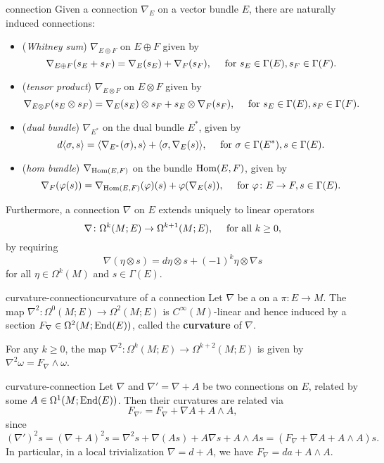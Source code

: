 \begin{example}{connection}
    Given a connection $\nabla_E$ on a vector bundle $E$, there are naturally induced connections:
    \begin{itemize}
        \item (\textit{Whitney sum}) $\nabla_{E \oplus F}$ on $E \oplus F$ given by
        \[ \nabla_{E \oplus F}(s_E + s_F) = \nabla_E(s_E) + \nabla_F(s_F), \quad \textup{ for } s_E \in \Gamma(E), s_F \in \Gamma(F) . \]
        \item (\textit{tensor product}) $\nabla_{E \otimes F}$ on $E \otimes F$ given by
        \[ \nabla_{E \otimes F}(s_E \otimes s_F) = \nabla_E(s_E) \otimes s_F + s_E \otimes \nabla_F(s_F), \quad \textup{ for } s_E \in \Gamma(E), s_F \in \Gamma(F) . \]
        \item (\textit{dual bundle}) $\nabla_{E^*}$ on the dual bundle $E^*$, given by
        \[ d \langle \sigma, s \rangle = \langle \nabla_{E^*} (\sigma), s \rangle + \langle \sigma, \nabla_E(s) \rangle, \quad \textup{ for } \sigma \in \Gamma(E^*), s \in \Gamma(E) . \]
        \item (\textit{hom bundle}) $\nabla_{\operatorname{Hom}(E, F)}$ on the bundle $\operatorname{Hom}(E, F)$, given by
        \[ \nabla_F(\varphi(s)) = \nabla_{\operatorname{Hom}(E, F)}(\varphi)(s) + \varphi(\nabla_E(s)), \quad \textup{ for } \varphi \colon E \to F, s \in \Gamma(E) . \]
    \end{itemize}
    Furthermore, a connection $\nabla$ on $E$ extends uniquely to linear operators
    \[ \nabla \colon \Omega^k(M; E) \to \Omega^{k + 1}(M; E), \quad \textup{ for all } k \ge 0,  \]
    by requiring
    \[ \nabla (\eta \otimes s) = d \eta \otimes s + (-1)^k \eta \otimes \nabla s \]
    for all $\eta \in \Omega^k(M)$ and $s \in \Gamma(E)$.
\end{example}

\begin{topic}{curvature-connection}{curvature of a connection}
    Let $\nabla$ be a  on a  $\pi \colon E \to M$. The map $\nabla^2 \colon \Omega^0(M; E) \to \Omega^2(M; E)$ is $C^\infty(M)$-linear and hence induced by a section $F_\nabla \in \Omega^2(M; \textup{End}(E))$, called the \textbf{curvature} of $\nabla$.
    
    For any $k \ge 0$, the map $\nabla^2 \colon \Omega^k(M; E) \to \Omega^{k + 2}(M; E)$ is given by $\nabla^2 \omega = F_\nabla \wedge \omega$.
\end{topic}

\begin{example}{curvature-connection}
    Let $\nabla$ and $\nabla' = \nabla + A$ be two connections on $E$, related by some $A \in \Omega^1(M; \textup{End}(E))$. Then their curvatures are related via
    \[ F_{\nabla'} = F_\nabla + \nabla A + A \wedge A , \]
    since
    \[ (\nabla')^2 s = (\nabla + A)^2 s = \nabla^2 s + \nabla (As) + A \nabla s + A \wedge A s = (F_\nabla + \nabla A + A \wedge A) s . \]
    In particular, in a local trivialization $\nabla = d + A$, we have $F_\nabla = da + A \wedge A$.
\end{example}

